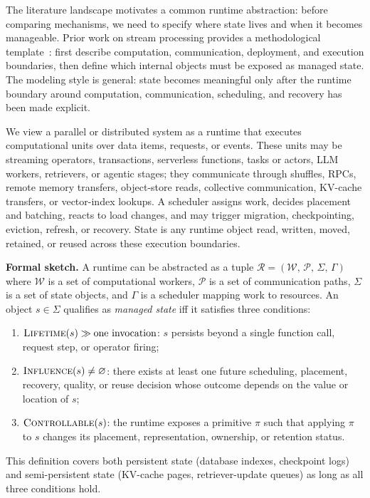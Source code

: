 \documentclass[manuscript,nonacm]{acmart}
\begin{document}
The literature landscape motivates a common runtime abstraction: before comparing mechanisms, we need to specify where state lives and when it becomes manageable. Prior work on stream processing provides a methodological template~\cite{fernandez2010seep,fernandez2013osm,mao2025spacker,carbone2015flink}: first describe computation, communication, deployment, and execution boundaries, then define which internal objects must be exposed as managed state. The modeling style is general: state becomes meaningful only after the runtime boundary around computation, communication, scheduling, and recovery has been made explicit.

We view a parallel or distributed system as a runtime that executes computational units over data items, requests, or events. These units may be streaming operators, transactions, serverless functions, tasks or actors, LLM workers, retrievers, or agentic stages; they communicate through shuffles, RPCs, remote memory transfers, object-store reads, collective communication, KV-cache transfers, or vector-index lookups. A scheduler assigns work, decides placement and batching, reacts to load changes, and may trigger migration, checkpointing, eviction, refresh, or recovery. State is any runtime object read, written, moved, retained, or reused across these execution boundaries.

\smallskip\noindent\textbf{Formal sketch.}
A runtime can be abstracted as a tuple \(\mathcal{R}=(\mathcal{W},\,\mathcal{P},\,\Sigma,\,\Gamma)\) where
\(\mathcal{W}\) is a set of computational workers,
\(\mathcal{P}\) is a set of communication paths,
\(\Sigma\) is a set of state objects, and
\(\Gamma\) is a scheduler mapping work to resources.
An object \(s\in\Sigma\) qualifies as \emph{managed state} iff it satisfies three conditions:
\begin{enumerate}[leftmargin=*,nosep]
\item \(\textsc{Lifetime}(s)\gg\text{one invocation}\): \(s\) persists beyond a single function call, request step, or operator firing;
\item \(\textsc{Influence}(s)\neq\varnothing\): there exists at least one future scheduling, placement, recovery, quality, or reuse decision whose outcome depends on the value or location of \(s\);
\item \(\textsc{Controllable}(s)\): the runtime exposes a primitive \(\pi\) such that applying \(\pi\) to \(s\) changes its placement, representation, ownership, or retention status.
\end{enumerate}
This definition covers both persistent state (database indexes, checkpoint logs) and semi-persistent state (KV-cache pages, retriever-update queues) as long as all three conditions hold.
\end{document}
